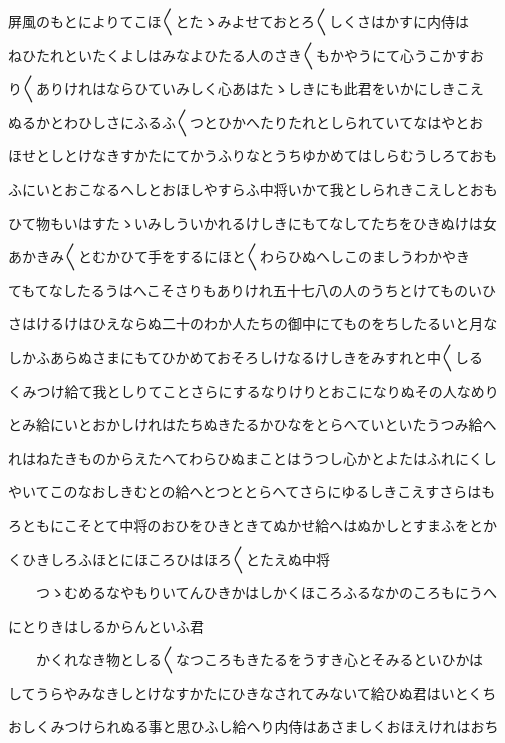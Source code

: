 \documentclass[a4paper,11pt,landscape]{ltjtarticle}
\begin{document}
\par\medskip
屏風のもとによりてこほ〱とたゝみよせておとろ〱しくさはかすに内侍は
\par\medskip
ねひたれといたくよしはみなよひたる人のさき〱もかやうにて心うこかすお
\par\medskip
り〱ありけれはならひていみしく心あはたゝしきにも此君をいかにしきこえ
\par\medskip
ぬるかとわひしさにふるふ〱つとひかへたりたれとしられていてなはやとお
\par\medskip
ほせとしとけなきすかたにてかうふりなとうちゆかめてはしらむうしろておも
\par\medskip
ふにいとおこなるへしとおほしやすらふ中将いかて我としられきこえしとおも
\par\medskip
ひて物もいはすたゝいみしういかれるけしきにもてなしてたちをひきぬけは女
\par\medskip
あかきみ〱とむかひて手をするにほと〱わらひぬへしこのましうわかやき
\par\medskip
てもてなしたるうはへこそさりもありけれ五十七八の人のうちとけてものいひ
\par\medskip
さはけるけはひえならぬ二十のわか人たちの御中にてものをちしたるいと月な
\par\medskip
しかふあらぬさまにもてひかめておそろしけなるけしきをみすれと中〱しる
\par\medskip
くみつけ給て我としりてことさらにするなりけりとおこになりぬその人なめり
\par\medskip
とみ給にいとおかしけれはたちぬきたるかひなをとらへていといたうつみ給へ
\par\medskip
れはねたきものからえたへてわらひぬまことはうつし心かとよたはふれにくし
\par\medskip
やいてこのなおしきむとの給へとつととらへてさらにゆるしきこえすさらはも
\par\medskip
ろともにこそとて中将のおひをひきときてぬかせ給へはぬかしとすまふをとか
\par\medskip
くひきしろふほとにほころひはほろ〱とたえぬ中将
\par\medskip
　　つゝむめるなやもりいてんひきかはしかくほころふるなかのころもにうへ
\par\medskip
にとりきはしるからんといふ君
\par\medskip
　　かくれなき物としる〱なつころもきたるをうすき心とそみるといひかは
\par\medskip
してうらやみなきしとけなすかたにひきなされてみないて給ひぬ君はいとくち
\par\medskip
おしくみつけられぬる事と思ひふし給へり内侍はあさましくおほえけれはおち
\end{document}
